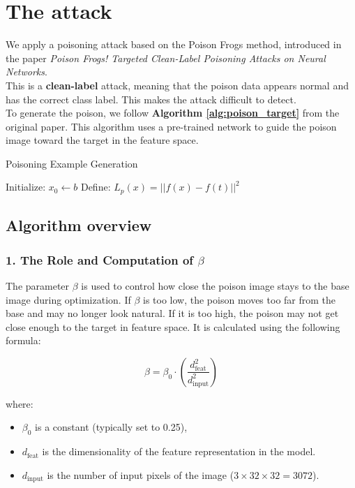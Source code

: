 \section{The attack}
We apply a poisoning attack based on the Poison Frogs method, introduced in the paper \textit{Poison Frogs! Targeted Clean-Label Poisoning Attacks on Neural Networks}.\\
This is a \textbf{clean-label} attack, meaning that the poison data appears normal and has the correct class label. This makes the attack difficult to detect.\\
To generate the poison, we follow \textbf{Algorithm \ref{alg:poison_target}} from the original paper. This algorithm uses a pre-trained network to guide the poison image toward the target in the feature space.\\

\begin{algorithm}[H]
    \caption{Poisoning Example Generation}
    \label{alg:poisoning_example}
    \BlankLine
    Initialize: $x_0 \leftarrow b$\;
    Define: $L_p(x) = ||f(x) - f(t)||^2$\;
    \label{alg:poison_target}
\end{algorithm}
\subsection{Algorithm overview}
\subsubsection*{1. The Role and Computation of $\beta$}

The parameter $\beta$ is used to control how close the poison image stays to the base image during optimization. If $\beta$ is too low, the poison moves too far from the base and may no longer look natural. If it is too high, the poison may not get close enough to the target in feature space.
It is calculated using the following formula:

\[
\beta = \beta_0 \cdot \left( \frac{d_{\text{feat}}^2}{d_{\text{input}}^2} \right)
\]

where:
\begin{itemize}
    \item $\beta_0$ is a constant (typically set to 0.25),
    \item $d_{\text{feat}}$ is the dimensionality of the feature representation in the model.
    \item $d_{\text{input}}$ is the number of input pixels of the image ($3 \times 32 \times 32 = 3072$).
\end{itemize}

